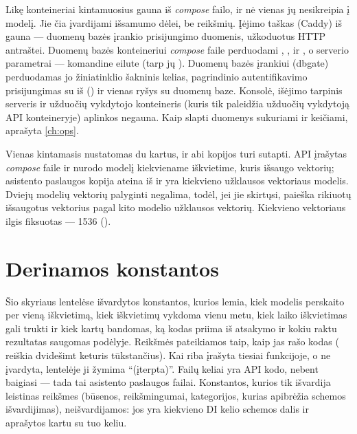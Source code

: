 Likę konteineriai kintamuosius gauna iš \textit{compose} failo, ir nė vienas jų nesikreipia į
modelį. Jie čia įvardijami išsamumo dėlei, be reikšmių. Įėjimo taškas (Caddy) iš 
gauna  --- duomenų bazės įrankio prisijungimo duomenis, užkoduotus HTTP
antraštei. Duomenų bazės konteineriui \textit{compose} faile perduodami ,
,  ir , o serverio parametrai ---
komandine eilute (tarp jų ). Duomenų bazės įrankiui (dbgate)
perduodamas jo žiniatinklio šakninis kelias, pagrindinio autentifikavimo prisijungimas su
 iš  () ir vienas ryšys su duomenų baze.
Konsolė, išėjimo tarpinis serveris ir užduočių vykdytojo konteineris (kuris tik paleidžia
užduočių vykdytoją API konteineryje) aplinkos negauna. Kaip slapti duomenys sukuriami ir
keičiami, aprašyta \cref{ch:ops}.

Vienas kintamasis nustatomas du kartus, ir abi kopijos turi sutapti. API 
įrašytas \textit{compose} faile ir nurodo modelį kiekviename iškvietime, kuris išsaugo vektorių;
asistento paslaugos kopija ateina iš  ir yra kiekvieno užklausos vektoriaus modelis.
Dviejų modelių vektorių palyginti negalima, todėl, jei jie skirtųsi, paieška rikiuotų išsaugotus
vektorius pagal kito modelio užklausos vektorių. Kiekvieno vektoriaus ilgis fiksuotas --- 1536
().


\section{Derinamos konstantos}\label{sec:config:constants}

Šio skyriaus lentelėse išvardytos konstantos, kurios lemia, kiek modelis perskaito per vieną
iškvietimą, kiek iškvietimų vykdoma vienu metu, kiek laiko iškvietimas gali trukti ir kiek kartų
bandomas, ką kodas priima iš atsakymo ir kokiu raktu rezultatas saugomas podėlyje. Reikšmės
pateikiamos taip, kaip jas rašo kodas ( reiškia dvidešimt keturis tūkstančius). Kai
riba įrašyta tiesiai funkcijoje, o ne įvardyta, lentelėje ji žymima \enquote{(įterpta)}. Failų
keliai yra API kodo, nebent baigiasi  --- tada tai asistento paslaugos failai. Konstantos,
kurios tik išvardija leistinas reikšmes (būsenos, reikšmingumai, kategorijos, kurias apibrėžia
schemos išvardijimas), neišvardijamos: jos yra kiekvieno DI kelio schemos dalis ir aprašytos kartu su
tuo keliu.


